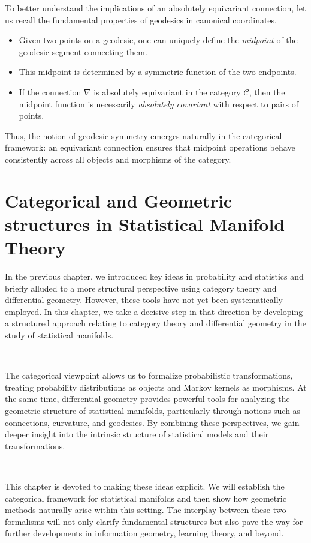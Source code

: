 To better understand the implications of an absolutely equivariant connection, let us recall the fundamental properties of geodesics in canonical coordinates.

\begin{itemize}
    \item Given two points on a geodesic, one can uniquely define the \textit{midpoint} of the geodesic segment connecting them.
    \item This midpoint is determined by a symmetric function of the two endpoints.
    \item If the connection $\nabla$ is absolutely equivariant in the category $\mathcal{C}$, then the midpoint function is necessarily \textit{absolutely covariant} with respect to pairs of points.
\end{itemize}

Thus, the notion of geodesic symmetry emerges naturally in the categorical framework: an equivariant connection ensures that midpoint operations behave consistently across all objects and morphisms of the category.

\chapter{Categorical and Geometric structures in Statistical Manifold Theory}

In the previous chapter, we introduced key ideas in probability and statistics and briefly alluded to a more structural perspective using category theory and differential geometry. However, these tools have not yet been systematically employed. In this chapter, we take a decisive step in that direction by developing a structured approach relating to category theory and differential geometry in the study of statistical manifolds.

\, 

The categorical viewpoint allows us to formalize probabilistic transformations, treating probability distributions as objects and Markov kernels as morphisms. At the same time, differential geometry provides powerful tools for analyzing the geometric structure of statistical manifolds, particularly through notions such as connections, curvature, and geodesics. By combining these perspectives, we gain deeper insight into the intrinsic structure of statistical models and their transformations.

\, 

This chapter is devoted to making these ideas explicit. We will establish the categorical framework for statistical manifolds and then show how geometric methods naturally arise within this setting. The interplay between these two formalisms will not only clarify fundamental structures but also pave the way for further developments in information geometry, learning theory, and beyond.

